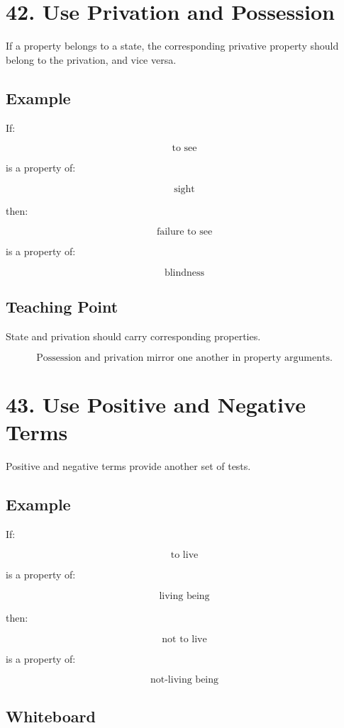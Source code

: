 \documentclass[12pt]{article}
\begin{document}
\section*{42. Use Privation and Possession}

If a property belongs to a state, the corresponding privative property should
belong to the privation, and vice versa.

\subsection*{Example}

If:

\[
\text{to see}
\]

is a property of:

\[
\text{sight}
\]

then:

\[
\text{failure to see}
\]

is a property of:

\[
\text{blindness}
\]

\subsection*{Teaching Point}

State and privation should carry corresponding properties.

\[
\boxed{
\text{Possession and privation mirror one another in property arguments.}
}
\]

\section*{43. Use Positive and Negative Terms}

Positive and negative terms provide another set of tests.

\subsection*{Example}

If:

\[
\text{to live}
\]

is a property of:

\[
\text{living being}
\]

then:

\[
\text{not to live}
\]

is a property of:

\[
\text{not-living being}
\]

\subsection*{Whiteboard}
\end{document}
